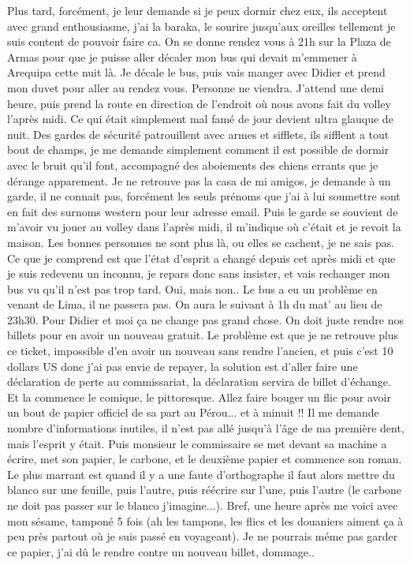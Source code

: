 \begin{multicols}{2}
Plus tard, forcément, je leur demande si je peux dormir chez eux, ils acceptent avec grand enthousiasme, j'ai la baraka, le sourire jusqu'aux oreilles tellement je suis content de pouvoir faire ca. On se donne rendez vous à 21h sur la Plaza de Armas pour que je puisse aller décaler mon bus qui devait m'emmener à Arequipa cette nuit là. Je décale le bus, puis vais manger avec Didier et prend mon duvet pour aller au rendez vous. Personne ne viendra. J'attend une demi heure, puis prend la route en direction de l'endroit où nous avons fait du volley l'après midi. Ce qui était simplement mal famé de jour devient ultra glauque de nuit. Des gardes de sécurité patrouillent avec armes et sifflets, ils sifflent a tout bout de champs, je me demande simplement comment il est possible de dormir avec le bruit qu'il font, accompagné des aboiements des chiens errants que je dérange apparement. Je ne retrouve pas la casa de mi amigos, je demande à un garde, il ne connait pas, forcément les seuls prénoms que j'ai à lui soumettre sont en fait des surnoms western pour leur adresse email. Puis le garde se souvient de m'avoir vu jouer au volley dans l'après midi, il m'indique où c'était et je revoit la maison. Les bonnes personnes ne sont plus là, ou elles se cachent, je ne sais pas. Ce que je comprend est que l'état d'esprit a changé depuis cet après midi et que je suis redevenu un inconnu, je repars donc sans insister, et vais rechanger mon bus vu qu'il n'est pas trop tard. Oui, mais non.. Le bus a eu un problème en venant de Lima, il ne passera pas. On aura le suivant à 1h du mat' au lieu de 23h30. Pour Didier et moi ça ne change pas grand chose. On doit juste rendre nos billets pour en avoir un nouveau gratuit. Le problème est que je ne retrouve plus ce ticket, impossible d'en avoir un nouveau sans rendre l'ancien, et puis c'est 10 dollars US donc j'ai pas envie de repayer, la solution est d'aller faire une déclaration de perte au commissariat, la déclaration servira de billet d'échange. Et la commence le comique, le pittoresque. Allez faire bouger un flic pour avoir un bout de papier officiel de sa part au Pérou... et à minuit !! Il me demande nombre d'informations inutiles, il n'est pas allé jusqu'à l'âge de ma première dent, mais l'esprit y était. Puis monsieur le commissaire se met devant sa machine a écrire, met son papier, le carbone, et le deuxième papier et commence son roman. Le plus marrant est quand il y a une faute d'orthographe il faut alors mettre du blanco sur une feuille, puis l'autre, puis réécrire sur l'une, puis l'autre (le carbone ne doit pas passer sur le blanco j'imagine...). Bref, une heure après me voici avec mon sésame, tamponé 5 fois (ah les tampons, les flics et les douaniers aiment ça à peu près partout où je suis passé en voyageant). Je ne pourrais méme pas garder ce papier, j'ai dû le rendre contre un nouveau billet, dommage..


\end{multicols}
